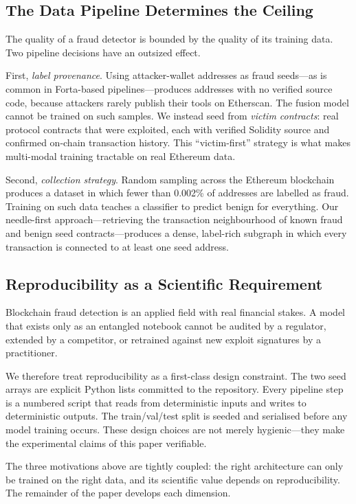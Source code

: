 \subsection{The Data Pipeline Determines the Ceiling}

The quality of a fraud detector is bounded by the quality of its training
data.  Two pipeline decisions have an outsized effect.

First, \emph{label provenance}.
Using attacker-wallet addresses as fraud seeds---as is common in Forta-based
pipelines---produces addresses with no verified source code, because
attackers rarely publish their tools on Etherscan.  The fusion model
cannot be trained on such samples.  We instead seed from
\emph{victim contracts}: real protocol contracts that were exploited, each
with verified Solidity source and confirmed on-chain transaction history.
This ``victim-first'' strategy is what makes multi-modal training
tractable on real Ethereum data.

Second, \emph{collection strategy}.
Random sampling across the Ethereum blockchain produces a dataset in which
fewer than 0.002\% of addresses are labelled as fraud.
Training on such data teaches a classifier to predict benign for
everything.  Our needle-first approach---retrieving the transaction
neighbourhood of known fraud and benign seed contracts---produces a dense,
label-rich subgraph in which every transaction is connected to at least
one seed address.

\subsection{Reproducibility as a Scientific Requirement}

Blockchain fraud detection is an applied field with real financial stakes.
A model that exists only as an entangled notebook cannot be audited by a
regulator, extended by a competitor, or retrained against new exploit
signatures by a practitioner.

We therefore treat reproducibility as a first-class design constraint.
The two seed arrays are explicit Python lists committed to the repository.
Every pipeline step is a numbered script that reads from deterministic
inputs and writes to deterministic outputs.
The train/val/test split is seeded and serialised before any model
training occurs.
These design choices are not merely hygienic---they make the experimental
claims of this paper verifiable.

The three motivations above are tightly coupled: the right architecture
can only be trained on the right data, and its scientific value depends
on reproducibility.  The remainder of the paper develops each dimension.
